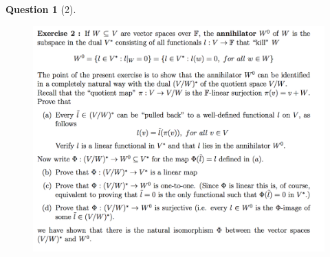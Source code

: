 \documentclass{article} %
\theoremstyle{quest}
\newtheorem*{question}{Question}
\begin{document}
\newpage

\begin{question}[2]
\hfill
\begin{figure}[h!]
  \centering
    \includegraphics[width=1\textwidth]{LA-3-2.png}
\end{figure}
\end{question}
\end{document}
